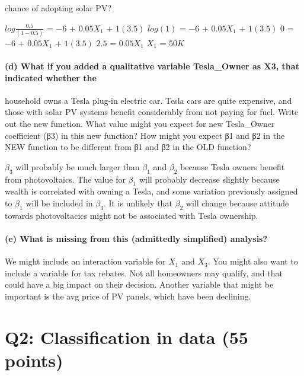 \documentclass[]{article}
\let\oldparagraph\paragraph
\renewcommand{\paragraph}[1]{\oldparagraph{#1}\mbox{}}
\begin{document}
chance of adopting solar PV?

\(log\)\(\frac{0.5}{(1-0.5)}\) = \(-6\) + \(0.05\)\(X_{1}\) +
\(1\)\((3.5)\) \(log\)\((1)\) = \(-6\) + \(0.05\)\(X_{1}\) +
\(1\)\((3.5)\) \(0\) = \(-6\) + \(0.05\)\(X_{1}\) + \(1\)\((3.5)\)
\(2.5\) = \(0.05\)\(X_{1}\) \(X_{1}\) = \(50K\)

\hypertarget{d-what-if-you-added-a-qualitative-variable-tesla_owner-as-x3-that-indicated-whether-the}{%
\paragraph{(d) What if you added a qualitative variable Tesla\_Owner as
X3, that indicated whether
the}\label{d-what-if-you-added-a-qualitative-variable-tesla_owner-as-x3-that-indicated-whether-the}}

household owns a Tesla plug-in electric car. Tesla cars are quite
expensive, and those with solar PV systems benefit considerably from not
paying for fuel. Write out the new function. What value might you expect
for new Tesla\_Owner coefficient (β3) in this new function? How might
you expect β1 and β2 in the NEW function to be different from β1 and β2
in the OLD function?

\(\beta_{3}\) will probably be much larger than \(\beta_{1}\) and
\(\beta_{2}\) because Tesla owners benefit from photovoltaics. The value
for \(\beta_{1}\) will probably decrease slightly because wealth is
correlated with owning a Tesla, and some variation previously assigned
to \(\beta_{1}\) will be included in \(\beta_{3}\). It is unlikely that
\(\beta_{2}\) will change because attitude towards photovoltacics might
not be associated with Tesla ownership.

\hypertarget{e-what-is-missing-from-this-admittedly-simplified-analysis}{%
\paragraph{(e) What is missing from this (admittedly simplified)
analysis?}\label{e-what-is-missing-from-this-admittedly-simplified-analysis}}

We might include an interaction variable for \(X_{1}\) and \(X_{3}\).
You might also want to include a variable for tax rebates. Not all
homeowners may qualify, and that could have a big impact on their
decision. Another variable that might be important is the avg price of
PV panels, which have been declining.

\hypertarget{q2-classification-in-data-55-points}{%
\section{Q2: Classification in data (55
points)}\label{q2-classification-in-data-55-points}}
\end{document}
